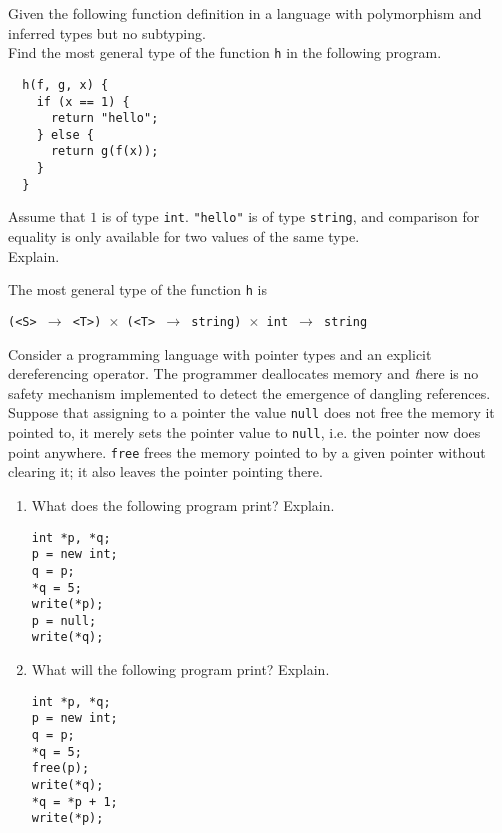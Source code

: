 \documentclass[11pt]{exam}
\begin{document}
\begin{questions}

      \question Given the following function definition in a language
        with polymorphism and inferred types but no subtyping.\\
        Find the most general type of the function {\tt h} in the following program.
\begin{lstlisting}
  h(f, g, x) {
    if (x == 1) {
      return "hello";
    } else {
      return g(f(x));
    }
  }
\end{lstlisting}
        Assume that $1$ is of type {\tt int}. {\tt "hello"} is of type {\tt string},
        and comparison for equality is only available for two values of the same type. \\
        Explain.

	\begin{framed}

            The most general type of the function {\tt h} is

            {\tt (<S> $\to$ <T>) $\times$ (<T> $\to$ string) $\times$ int $\to$ string}

	\end{framed}


	\question Consider a programming language with pointer types and an explicit dereferencing operator. The programmer deallocates memory and {\emph there is no safety mechanism implemented to detect the emergence of dangling references}. Suppose that assigning to a pointer the value {\tt null} does not free the memory it pointed to, it merely sets the pointer value to {\tt null}, i.e. the pointer now does point anywhere. {\tt free} frees the memory pointed to by a given pointer without clearing it; it also leaves the pointer pointing there.

      \begin{enumerate}[label=(\roman*)]
      \item What does the following program print? Explain.
\begin{lstlisting}
int *p, *q;
p = new int;
q = p;
*q = 5;
write(*p);
p = null;
write(*q);
\end{lstlisting}

            \item What will the following program print? Explain.
\begin{lstlisting}
int *p, *q;
p = new int;
q = p;
*q = 5;
free(p);
write(*q);
*q = *p + 1;
write(*p);
\end{lstlisting}


\end{enumerate}
\end{questions}
\end{document}
